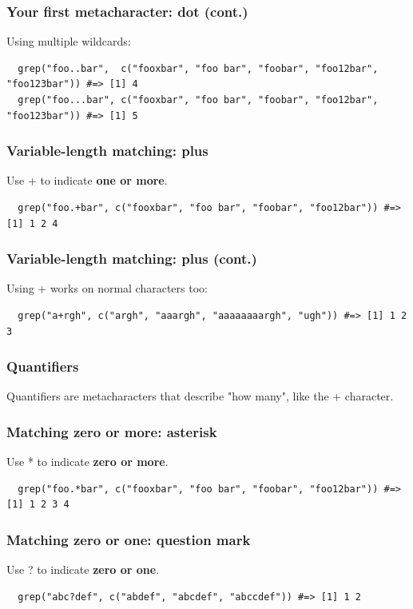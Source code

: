 \documentclass{beamer}
\begin{document}
\begin{frame}[fragile]
  \frametitle{Your first metacharacter: dot (cont.)}
  Using multiple wildcards:
  \vspace{3mm}

\begin{verbatim}
  grep("foo..bar",  c("fooxbar", "foo bar", "foobar", "foo12bar", "foo123bar")) #=> [1] 4
  grep("foo...bar", c("fooxbar", "foo bar", "foobar", "foo12bar", "foo123bar")) #=> [1] 5
\end{verbatim}
\end{frame}
\begin{frame}[fragile]
  \frametitle{Variable-length matching: plus}
  Use + to indicate \textbf{one or more}.
  \vspace{3mm}

\begin{verbatim}
  grep("foo.+bar", c("fooxbar", "foo bar", "foobar", "foo12bar")) #=> [1] 1 2 4
\end{verbatim}
\end{frame}
\begin{frame}[fragile]
  \frametitle{Variable-length matching: plus (cont.)}
  Using + works on normal characters too:
  \vspace{3mm}

\begin{verbatim}
  grep("a+rgh", c("argh", "aaargh", "aaaaaaaargh", "ugh")) #=> [1] 1 2 3
\end{verbatim}
\end{frame}
\begin{frame}
  \frametitle{Quantifiers}
  Quantifiers are metacharacters that describe "how many", like the + character.
\end{frame}
\begin{frame}[fragile]
  \frametitle{Matching zero or more: asterisk}
  Use * to indicate \textbf{zero or more}.
  \vspace{3mm}

\begin{verbatim}
  grep("foo.*bar", c("fooxbar", "foo bar", "foobar", "foo12bar")) #=> [1] 1 2 3 4
\end{verbatim}
\end{frame}
\begin{frame}[fragile]
  \frametitle{Matching zero or one: question mark}
  Use ? to indicate \textbf{zero or one}.
  \vspace{3mm}

\begin{verbatim}
  grep("abc?def", c("abdef", "abcdef", "abccdef")) #=> [1] 1 2
\end{verbatim}
\end{frame}
\end{document}
